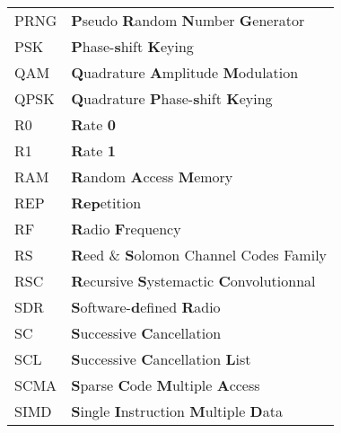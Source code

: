 \begin{center}
\begin{longtable}{ p{}  p{} }
PRNG        & \textbf{P}seudo \textbf{R}andom \textbf{N}umber \textbf{G}enerator                                              \\
PSK         & \textbf{P}hase-\textbf{s}hift \textbf{K}eying                                                                   \\
QAM         & \textbf{Q}uadrature \textbf{A}mplitude \textbf{M}odulation                                                      \\
QPSK        & \textbf{Q}uadrature \textbf{P}hase-\textbf{s}hift \textbf{K}eying                                               \\
R0          & \textbf{R}ate \textbf{0}                                                                                        \\
R1          & \textbf{R}ate \textbf{1}                                                                                        \\
RAM         & \textbf{R}andom \textbf{A}ccess \textbf{M}emory                                                                 \\
REP         & \textbf{Rep}etition                                                                                             \\
RF          & \textbf{R}adio \textbf{F}requency                                                                               \\
RS          & \textbf{R}eed \& \textbf{S}olomon Channel Codes Family                                                          \\
RSC         & \textbf{R}ecursive \textbf{S}ystemactic \textbf{C}onvolutionnal                                                 \\
SDR         & \textbf{S}oftware-\textbf{d}efined \textbf{R}adio                                                               \\
SC          & \textbf{S}uccessive \textbf{C}ancellation                                                                       \\
SCL         & \textbf{S}uccessive \textbf{C}ancellation \textbf{L}ist                                                         \\
SCMA        & \textbf{S}parse \textbf{C}ode \textbf{M}ultiple \textbf{A}ccess                                                 \\
SIMD        & \textbf{S}ingle \textbf{I}nstruction \textbf{M}ultiple \textbf{D}ata                                            \\

\end{longtable}
\end{center}
